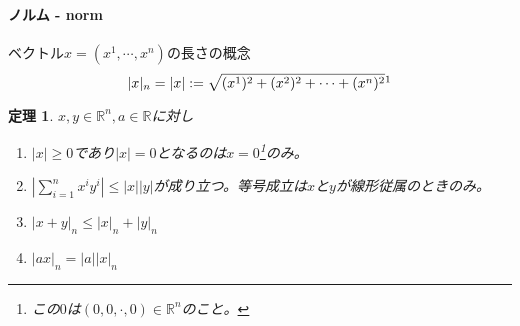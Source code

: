 \documentclass[dvipdfmx,a4j,10pt]{jsarticle}
\theoremstyle{mystyle1}
\newtheorem{thm}[dfn]{定理}
\theoremstyle{mystyle2}
\begin{document}
\paragraph{ノルム - norm}
ベクトル$x=(x^1,\cdots,x^n)$の長さの概念
\[|x|_n=|x|:=\sqrt{(x^1)^2+(x^2)^2+\cdots+(x^n)^2}\footnotemark\]
\begin{framed}
\begin{thm}
$x,y\in\mathbb{R}^n,a\in\mathbb{R}$に対し
\begin{enumerate}
	\item $|x|\geq0$であり$|x|=0$となるのは$x=0$\footnote{この$0$は$(0,0,\cdot,0)\in\mathbb{R}^n$のこと。}のみ。
	\item $\displaystyle \left|\sum_{i=1}^n x^iy^i\right|\leq|x||y|$が成り立つ。等号成立は$x$と$y$が線形従属のときのみ。\footnotemark
	\item $|x+y|_n\leq|x|_n+|y|_n$
	\item $|ax|_n=|a||x|_n$
\end{enumerate}
\end{thm}
\end{framed}
\end{document}
